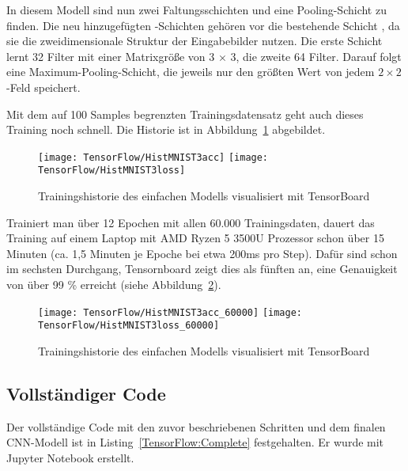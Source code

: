 \medskip

In diesem Modell sind nun zwei Faltungsschichten und eine Pooling-Schicht zu finden. Die neu hinzugefügten -Schichten gehören vor die bestehende Schicht , da sie die zweidimensionale Struktur der Eingabebilder nutzen. Die erste Schicht lernt 32 Filter mit einer Matrixgröße von 3 $\times$ 3, die zweite 64 Filter. Darauf folgt eine Maximum-Pooling-Schicht, die jeweils nur den größten Wert von jedem $2 \times 2$-Feld speichert.

Mit dem auf 100 Samples begrenzten Trainingsdatensatz geht auch dieses Training noch schnell. Die Historie ist in Abbildung~\ref{HistMNIST3} abgebildet.

\begin{figure}[H]
	\begin{center}
		\texttt{[image: TensorFlow/HistMNIST3acc]}
		\texttt{[image: TensorFlow/HistMNIST3loss]}
		\caption{Trainingshistorie des einfachen Modells visualisiert mit TensorBoard} 
		\label{HistMNIST3}
	\end{center}
\end{figure}

Trainiert man über 12 Epochen mit allen 60.000 Trainingsdaten, dauert das Training auf einem Laptop mit AMD Ryzen 5 3500U Prozessor schon über 15 Minuten (ca. 1,5 Minuten je Epoche bei etwa 200ms pro Step). Dafür sind schon im sechsten Durchgang, Tensornboard zeigt dies als fünften an,  eine Genauigkeit von über 99 \% erreicht (siehe Abbildung~\ref{HistMNIST3_60000}).

\begin{figure}[H]
	\begin{center}
		\texttt{[image: TensorFlow/HistMNIST3acc\_60000]}
		\texttt{[image: TensorFlow/HistMNIST3loss\_60000]}
		\caption{Trainingshistorie des einfachen Modells visualisiert mit TensorBoard} 
		\label{HistMNIST3_60000}
	\end{center}
\end{figure}

\subsection{Vollständiger Code}

Der vollständige Code mit den zuvor beschriebenen Schritten und dem finalen CNN-Modell ist in Listing~\ref{TensorFlow:Complete} festgehalten. Er wurde mit Jupyter Notebook erstellt.

